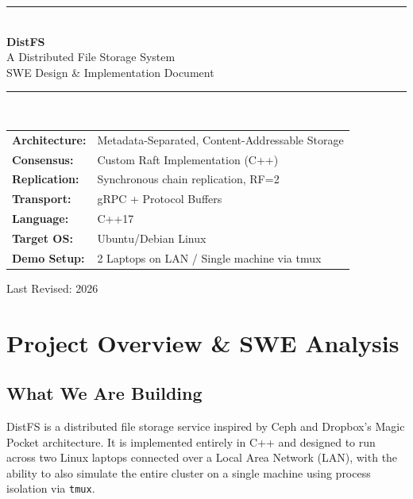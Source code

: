 \documentclass[12pt,a4paper]{article}
\begin{document}

\begin{titlepage}
  \centering
  \vspace*{2cm}
  {\color{primary}\rule{\linewidth}{1.5pt}}\\[0.4cm]
  {\Huge\bfseries\color{primary} DistFS}\\[0.3cm]
  {\Large\color{accent} A Distributed File Storage System}\\[0.2cm]
  {\large\color{gray} SWE Design \& Implementation Document}\\[0.1cm]
  {\color{primary}\rule{\linewidth}{1.5pt}}\\[1.5cm]

  \begin{tabular}{ll}
    \textbf{Architecture:}   & Metadata-Separated, Content-Addressable Storage \\[4pt]
    \textbf{Consensus:}      & Custom Raft Implementation (C++) \\[4pt]
    \textbf{Replication:}    & Synchronous chain replication, RF=2 \\[4pt]
    \textbf{Transport:}      & gRPC + Protocol Buffers \\[4pt]
    \textbf{Language:}       & C++17 \\[4pt]
    \textbf{Target OS:}      & Ubuntu/Debian Linux \\[4pt]
    \textbf{Demo Setup:}     & 2 Laptops on LAN / Single machine via tmux \\
  \end{tabular}

  \vfill
  {\color{gray}\small Last Revised: 2026}
\end{titlepage}

\tableofcontents
\newpage

\section{Project Overview \& SWE Analysis}

\subsection{What We Are Building}

DistFS is a distributed file storage service inspired by Ceph and Dropbox's Magic Pocket architecture. It is implemented entirely in C++ and designed to run across two Linux laptops connected over a Local Area Network (LAN), with the ability to also simulate the entire cluster on a single machine using process isolation via \texttt{tmux}.
\end{document}
